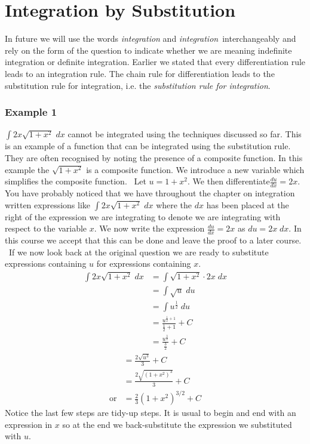 \section{Integration by Substitution}
In future we will use the words \emph{integration} and \emph{integration}\ interchangeably
and rely on the form of the question to indicate whether we are meaning indefinite integration or definite integration. Earlier
we stated that every differentiation rule leads to an integration rule. The chain rule for differentiation
leads to the substitution rule for integration, i.e. the \emph{substitution rule for integration}. 

\subsubsection{Example 1}
$\int 2 x \sqrt{1 +x^{2}}\; d x$ cannot be integrated using the techniques discussed so far. This is an example of a function
that can be integrated using the substitution rule. They are often recognised by noting the presence of a composite
function. In this example the $\sqrt{1 +x^{2}}$ is a composite function. We introduce a new variable which simplifies the composite function.
\ Let $u =1 +x^{2}$. We then differentiate$\frac{d u}{d x} =2 x$. You have probably noticed that we have throughout the chapter on integration written expressions
like $\int 2 x \sqrt{1 +x^{2}}\; d x$ where the $d x$ has been placed at the right of the expression we are integrating to denote we are integrating with respect to the variable
$x$. We now write the expression $\frac{d u}{d x} =2 x$ as $d u =2 x\; d x$. In this course we accept that this can be done and leave the proof to a later course.
\ If we now look back at the original question we are ready to substitute expressions containing $u$ for expressions containing $x$.
\begin{align*}\int 2 x \sqrt{1 +x^{2}}\; d x &  = \int \sqrt{1 +x^{2}} \cdot 2 x\; d x \\
 &  = \int \sqrt{u}\; d u \\
 &  = \int u^{\frac{1}{2}}\; d u \\
 &  = \frac{u^{\frac{1}{2} +1}}{\frac{1}{2} +1} +C \\
 &  = \frac{u^{\frac{3}{2}}}{\frac{3}{2}} +C\end{align*}
\begin{align*} &  = \frac{2 \sqrt{u^{3}}}{3} +C \\
 &  = \frac{2 \sqrt{\left (1 +x^{2}\right )^{3}}}{3} +C \\
\text{or} &  = \frac{2}{3} \left (1 +x^{2}\right )^{3/2} +C\end{align*}Notice the last few steps are tidy-up steps. It is usual to begin and end
with an expression in $x$ so at the end we back-substitute the expression we substituted with $u$. 

